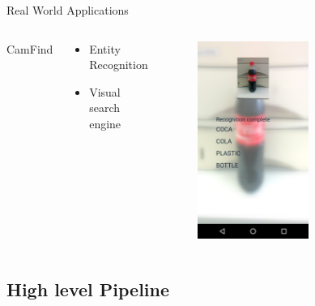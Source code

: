 \documentclass{beamer}
\begin{document}
    \begin{frame}{Real World Applications}

      \begin{columns}[c]
          \begin{center}
            CamFind
          \end{center}
          \begin{center}
            \begin{itemize}
              \item Entity Recognition
              \item Visual search engine
            \end{itemize}
          \end{center}
        \begin{figure}
          \includegraphics[width=0.6\textwidth]{images/slides/cam_find_1.png}
        \end{figure}
      \end{columns}

    \end{frame}

    \subsection{High level Pipeline}
\end{document}
